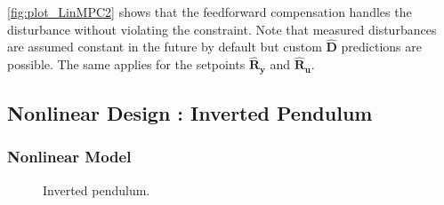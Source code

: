 \cref{fig:plot_LinMPC2} shows that the feedforward compensation handles the disturbance without violating the constraint. Note that measured disturbances are assumed constant in the future by default but custom $\mathbf{\hat{D}}$ predictions are possible. The same applies for the setpoints $\mathbf{\hat{R}_y}$ and $\mathbf{\hat{R}_u}$.

\subsection{Nonlinear Design : Inverted Pendulum}
\label{sec.nonlinear_design}

\subsubsection{Nonlinear Model}

\begin{figure}[b]
    \centering
    
    \caption{Inverted pendulum.}
    \label{fig:pendulum}
\end{figure}

